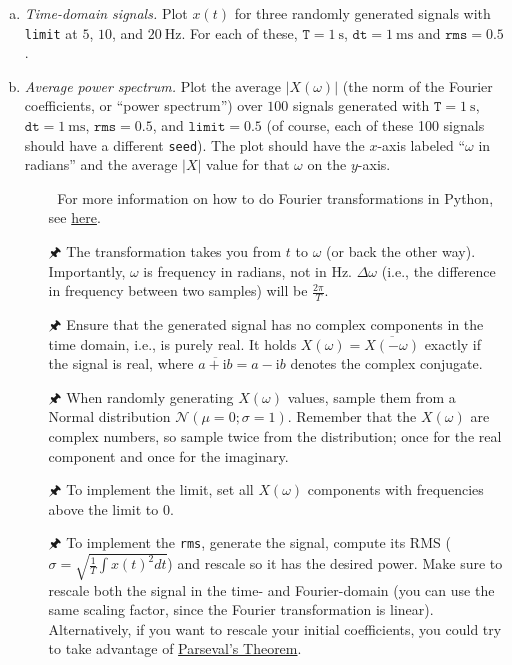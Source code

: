 	\begin{enumerate}[a)]
		\item {} \textit{Time-domain signals.} Plot $x(t)$ for three randomly generated signals with \texttt{limit} at $5$, $10$, and $\SI{20}{\hertz}$. For each of these, $\mathtt{T}=\SI{1}{\second}$, $\mathtt{dt}=\SI{1}{\milli\second}$ and $\mathtt{rms}=0.5$.
		\item {} \textit{Average power spectrum.} Plot the average $|X(\omega)|$ (the norm of the Fourier coefficients, or \enquote{power spectrum}) over $100$ signals generated with $\mathtt{T}=\SI{1}{\second}$, $\mathtt{dt}=\SI{1}{\milli\second}$, $\mathtt{rms}=0.5$, and $\mathtt{limit}=0.5$ (of course, each of these 100 signals should have a different \texttt{seed}). The plot should have the $x$-axis labeled \enquote{$\omega$ in radians} and the average $|X|$ value for that $\omega$ on the $y$-axis.
		\begin{itemize}
			\item[{\symbolfont 🐍}] For more information on how to do Fourier transformations in Python, see \href{http://docs.scipy.org/doc/numpy/reference/routines.fft.html}{here}.
			\item[{\symbolfont 🖈}] The transformation takes you from $t$ to $\omega$ (or back the other way). Importantly, $\omega$ is frequency in radians, not in Hz. $\Delta \omega$ (i.e., the difference in frequency between two samples) will be $\frac{2\pi}T$.
			\item[{\symbolfont 🖈}] Ensure that the generated signal has no complex components in the time domain, i.e., is purely real. It holds $X(\omega)=\overline{X(-\omega)}$ exactly if the signal is real, where $\overline{a + \mathrm{i}b} = a - \mathrm{i}b$ denotes the complex conjugate.
			\item[{\symbolfont 🖈}] When randomly generating $X(\omega)$ values, sample them from a Normal distribution $\mathcal{N}(\mu=0; \sigma=1)$. Remember that the $X(\omega)$ are complex numbers, so sample twice from the distribution; once for the real component and once for the imaginary.
			\item[{\symbolfont 🖈}] To implement the limit, set all $X(\omega)$ components with frequencies above the limit to $0$.
			\item[{\symbolfont 🖈}] To implement the \texttt{rms}, generate the signal, compute its RMS ($\sigma = \sqrt{\frac{1}T \int{x(t)^2}dt}$) and rescale so it has the desired power. Make sure to rescale both the signal in the time- and Fourier-domain (you can use the same scaling factor, since the Fourier transformation is linear). Alternatively, if you want to rescale your initial coefficients, you could try to take advantage of \href{https://en.wikipedia.org/wiki/Parseval%27s_theorem#Notation_used_in_physics}{Parseval's Theorem}.
		\end{itemize}
	\end{enumerate}

